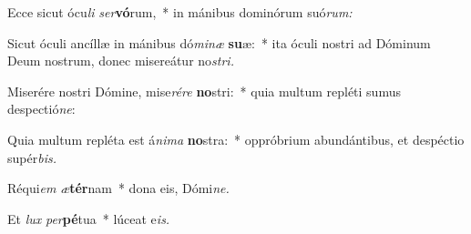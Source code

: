 \item Ecce sicut ócu\textit{li} \textit{ser}\textbf{vó}rum,~* in mánibus dominórum suó\textit{rum:}
\item Sicut óculi ancíllæ in mánibus dó\textit{minæ} \textbf{su}æ:~* ita óculi nostri ad Dóminum Deum nostrum, donec misereátur no\textit{stri.}
\item Miserére nostri Dómine, mise\textit{rére} \textbf{no}stri:~* quia multum repléti sumus despectió\textit{ne}:
\item Quia multum repléta est á\textit{nima} \textbf{no}stra:~* oppróbrium abundántibus, et despéctio supér\textit{bis.}
\item Réqui\textit{em} \textit{æ}\textbf{tér}nam~* dona eis, Dómi\textit{ne.}
\item Et \textit{lux} \textit{per}\textbf{pé}tua~* lúceat e\textit{is.}